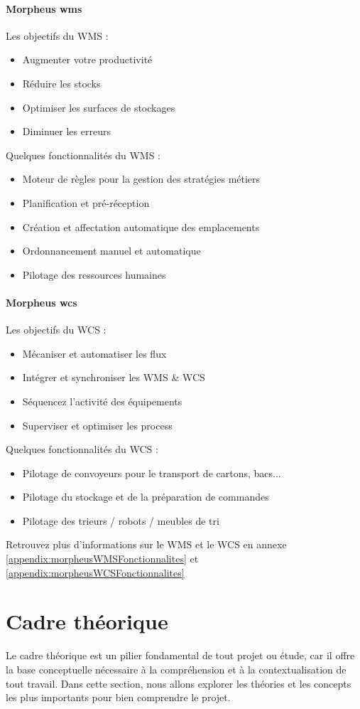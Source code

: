\documentclass[a4paper, 12pt, french]{article}
\newcommand{\bdot}{\item[\color{ssiYellow}\ding{108}]}
\begin{document}
			\subsection{Morpheus \acrshort{wms}}
				\noindent				
				Les objectifs du WMS :%
				\begin{itemize}
					\bdot{Augmenter votre productivité}
					\bdot{Réduire les stocks}
					\bdot{Optimiser les surfaces de stockages}
					\bdot{Diminuer les erreurs}
				\end{itemize}
				\newpage
				\noindent Quelques fonctionnalités du WMS :
				\begin{itemize}
					\bdot{Moteur de règles pour la gestion des stratégies métiers}
					\bdot{Planification et pré-réception}
					\bdot{Création et affectation automatique des emplacements}
					\bdot{Ordonnancement manuel et automatique}
					\bdot{Pilotage des ressources humaines}
				\end{itemize}
			
			\subsection{Morpheus \acrshort{wcs}}
				\noindent
				Les objectifs du WCS :
				\begin{itemize}
					\bdot{Mécaniser et automatiser les flux}
					\bdot{Intégrer et synchroniser les WMS \& WCS}
					\bdot{Séquencez l'activité des équipements}
					\bdot{Superviser et optimiser les process}
				\end{itemize}
				\vspace{\baselineskip}
				Quelques fonctionnalités du WCS :
				\begin{itemize}
					\bdot{Pilotage de convoyeurs pour le transport de cartons, bacs...}
					\bdot{Pilotage du stockage et de la préparation de commandes}
					\bdot{Pilotage des trieurs / robots / meubles de tri}
				\end{itemize}
				\vspace{\baselineskip}
				Retrouvez plus d'informations sur le WMS et le WCS en annexe \ref{appendix:morpheusWMSFonctionnalites}  et \ref{appendix:morpheusWCSFonctionnalites} 

	\newpage

	\part{Cadre théorique}
		Le cadre théorique est un pilier fondamental de tout projet ou étude, car il offre la base conceptuelle nécessaire à la compréhension et à la contextualisation de tout travail. Dans cette section, nous allons explorer les théories et les concepts les plus importants pour bien comprendre le projet.\\
\end{document}
